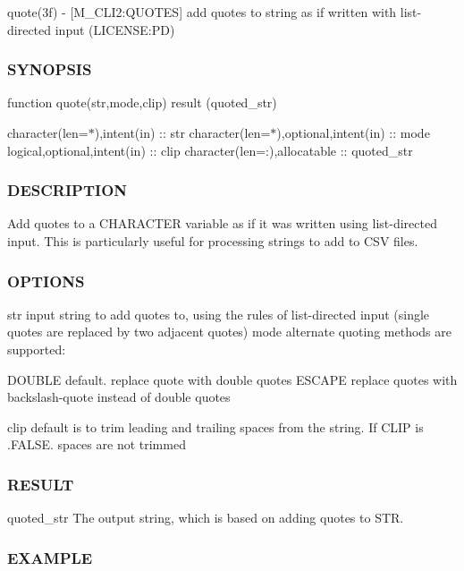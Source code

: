 quote(3f) -\/ \mbox{[}M\+\_\+\+C\+L\+I2\+:Q\+U\+O\+T\+ES\mbox{]} add quotes to string as if written with list-\/directed input (L\+I\+C\+E\+N\+SE\+:PD) \subsubsection*{S\+Y\+N\+O\+P\+S\+IS}

function quote(str,mode,clip) result (quoted\+\_\+str)

character(len=$\ast$),intent(in) \+:\+: str character(len=$\ast$),optional,intent(in) \+:\+: mode logical,optional,intent(in) \+:\+: clip character(len=\+:),allocatable \+:\+: quoted\+\_\+str \subsubsection*{D\+E\+S\+C\+R\+I\+P\+T\+I\+ON}

Add quotes to a C\+H\+A\+R\+A\+C\+T\+ER variable as if it was written using list-\/directed input. This is particularly useful for processing strings to add to C\+SV files.

\subsubsection*{O\+P\+T\+I\+O\+NS}

str input string to add quotes to, using the rules of list-\/directed input (single quotes are replaced by two adjacent quotes) mode alternate quoting methods are supported\+: \begin{DoxyVerb}           DOUBLE   default. replace quote with double quotes
           ESCAPE   replace quotes with backslash-quote instead of double quotes
\end{DoxyVerb}


clip default is to trim leading and trailing spaces from the string. If C\+L\+IP is .F\+A\+L\+SE. spaces are not trimmed

\subsubsection*{R\+E\+S\+U\+LT}

quoted\+\_\+str The output string, which is based on adding quotes to S\+TR. \subsubsection*{E\+X\+A\+M\+P\+LE}

